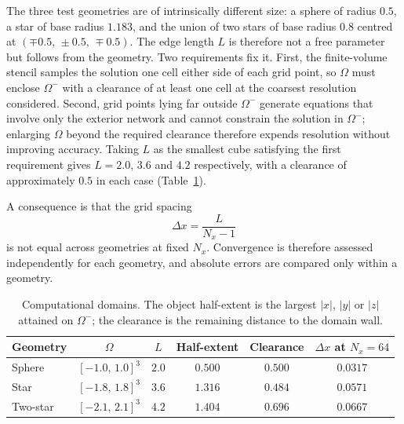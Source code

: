 

The three test geometries are of intrinsically different size: a sphere of radius
$0.5$, a star of base radius $1.183$, and the union of two stars of base radius $0.8$
centred at $(\mp 0.5,\, \pm 0.5,\, \mp 0.5)$. The edge length $L$ is therefore not a
free parameter but follows from the geometry. Two requirements fix it. First, the
finite-volume stencil samples the solution one cell either side of each grid point,
so $\Omega$ must enclose $\Omega^{-}$ with a clearance of at least one cell at the
coarsest resolution considered. Second, grid points lying far outside $\Omega^{-}$
generate equations that involve only the exterior network and cannot constrain the
solution in $\Omega^{-}$; enlarging $\Omega$ beyond the required clearance therefore
expends resolution without improving accuracy. Taking $L$ as the smallest cube
satisfying the first requirement gives $L = 2.0$, $3.6$ and $4.2$ respectively, with
a clearance of approximately $0.5$ in each case (Table~\ref{tab:domains}).

A consequence is that the grid spacing
\begin{equation}
    \Delta x = \frac{L}{N_{x} - 1}
    \label{eq:spacing}
\end{equation}
is not equal across geometries at fixed $N_{x}$. Convergence is therefore assessed
independently for each geometry, and absolute errors are compared only within a
geometry.

\begin{table}[H]
  \centering
  \caption{Computational domains. The object half-extent is the largest $|x|$, $|y|$
           or $|z|$ attained on $\Omega^{-}$; the clearance is the remaining distance
           to the domain wall.}
  \label{tab:domains}
  \begin{tabular}{lccccc}
    \toprule
    Geometry & $\Omega$ & $L$ & Half-extent & Clearance & $\Delta x$ at $N_x{=}64$ \\
    \midrule
    Sphere   & $[-1.0,\,1.0]^{3}$ & $2.0$ & $0.500$ & $0.500$ & $0.0317$ \\
    Star     & $[-1.8,\,1.8]^{3}$ & $3.6$ & $1.316$ & $0.484$ & $0.0571$ \\
    Two-star & $[-2.1,\,2.1]^{3}$ & $4.2$ & $1.404$ & $0.696$ & $0.0667$ \\
    \bottomrule
  \end{tabular}
\end{table}
